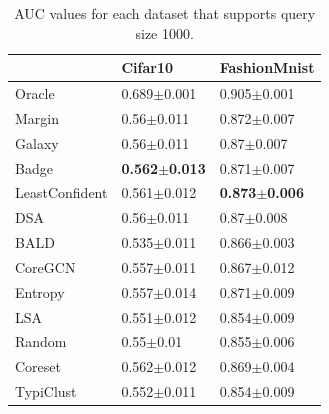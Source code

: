 \documentclass[]{article}
\begin{document}
\begin{table}[H]
	\caption{AUC values for each dataset that supports query size 1000.}
	\begin{tabular}{l|ll}
		& Cifar10 & FashionMnist \\
		\hline
Oracle & 0.689$\pm${\small0.001} & 0.905$\pm${\small0.001} \\
Margin & 0.56$\pm${\small0.011} & 0.872$\pm${\small0.007} \\
Galaxy & 0.56$\pm${\small0.011} & 0.87$\pm${\small0.007} \\
Badge & \textbf{0.562$\pm${\small0.013}} & 0.871$\pm${\small0.007} \\
LeastConfident & 0.561$\pm${\small0.012} & \textbf{0.873$\pm${\small0.006}} \\
DSA & 0.56$\pm${\small0.011} & 0.87$\pm${\small0.008} \\
BALD & 0.535$\pm${\small0.011} & 0.866$\pm${\small0.003} \\
CoreGCN & 0.557$\pm${\small0.011} & 0.867$\pm${\small0.012} \\
Entropy & 0.557$\pm${\small0.014} & 0.871$\pm${\small0.009} \\
LSA & 0.551$\pm${\small0.012} & 0.854$\pm${\small0.009} \\
Random & 0.55$\pm${\small0.01} & 0.855$\pm${\small0.006} \\
Coreset & 0.562$\pm${\small0.012} & 0.869$\pm${\small0.004} \\
TypiClust & 0.552$\pm${\small0.011} & 0.854$\pm${\small0.009}	
	\end{tabular}
\end{table}


\end{document}
